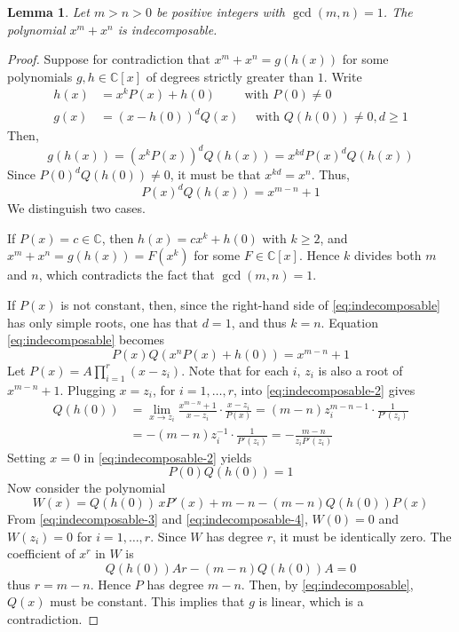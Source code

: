\documentclass[11pt, reqno]{amsart}
\theoremstyle{plain}
\newtheorem{lem}[thm]{Lemma}
\theoremstyle{definition}
\newcommand{\CC}{\mathbb{C}}
\begin{document}
\begin{lem}\label{lem:indecomp}
Let $m>n >0$ be positive integers with $\gcd(m,n)=1$. The polynomial 
$
x^{m}+x^{n}
$
is indecomposable. 
\end{lem}
\begin{proof}
Suppose for contradiction that $x^{m}+x^{n}=g(h(x)) $ for some polynomials $g,h \in \CC[x]$ of degrees strictly greater than $1$.
Write
\begin{align*}
    h(x) &= x^{k} P(x) + h(0) \qquad \text{ with } P(0) \neq 0 \\
    g(x) &= \left(x-h(0) \right)^{d} Q(x)  \quad \text{ with } Q(h(0)) \neq 0 , d \ge 1
\end{align*}
Then,
\[
g(h(x)) = \left(x^{k}P(x)\right)^{d} Q(h(x)) = x^{kd} P(x)^{d} Q(h(x)) 
\]
Since $P(0)^{d}Q(h(0)) \neq 0$, it must be that $x^{kd} = x^{n}$.
Thus,
\begin{equation}    \label{eq:indecomposable}
P(x)^{d} Q(h(x)) = x^{m-n} +1 
\end{equation}
We distinguish two cases.

If $P(x) = c \in \CC$, then $h(x) = c x^{k} + h(0)$ with $k \ge 2$, and 
$
x^{m} + x^{n} = g(h(x)) = F(x^{k})
$
for some $F \in \CC[x]$. Hence $k$ divides both $m$ and $n$, which contradicts the fact that $\gcd(m,n) = 1$.

If $P(x)$ is not constant, then, since the right-hand side of \eqref{eq:indecomposable} has only simple roots, one has that $d = 1$, and thus $k = n$.
Equation \eqref{eq:indecomposable} becomes
\begin{equation}\label{eq:indecomposable-2}
    P(x) Q\left(x^{n} P(x) + h(0)\right) = x^{m-n} + 1
\end{equation}
Let $P(x) = A \prod_{i=1}^r (x - z_i)$. Note that for each $i$, $z_i$ is also a root of $x^{m-n}+1$. Plugging $x = z_i$, for $i=1,\dots,r$, into \eqref{eq:indecomposable-2} gives
\begin{equation}
\label{eq:indecomposable-3}
\begin{split}
   Q(h(0))&= \lim_{x \to z_i } \frac{x^{m-n} + 1}{x - z_i} \cdot \frac{x - z_i}{P(x)} 
   = (m-n) z_i^{m-n-1} \cdot \frac{1}{P'(z_i)} \\ &= - (m-n) z_i^{-1} \cdot \frac{1}{P'(z_i)} = -\frac{m-n}{z_i P'(z_i)}
\end{split}
\end{equation}
Setting $x = 0$ in \eqref{eq:indecomposable-2} yields
\begin{equation}\label{eq:indecomposable-4}
    P(0) Q(h(0)) = 1
\end{equation}
Now consider the polynomial
\[
W(x) = Q(h(0))\, x P'(x) + m - n - (m-n) Q(h(0)) P(x)
\]
From \eqref{eq:indecomposable-3} and \eqref{eq:indecomposable-4}, $W(0) = 0$ and $W(z_i) = 0$ for $i = 1, \dots, r$. Since $W$ has degree $r$, it must be identically zero. 
The coefficient of $x^{r}$ in $W$ is
\[
Q(h(0)) A r -(m-n) Q(h(0)) A= 0
\]
thus $r = m - n$. Hence $P$ has degree $m - n$. Then, by \eqref{eq:indecomposable}, $Q(x)$ must be constant. This implies that $g$ is linear, which is a contradiction.
\end{proof}
\end{document}
